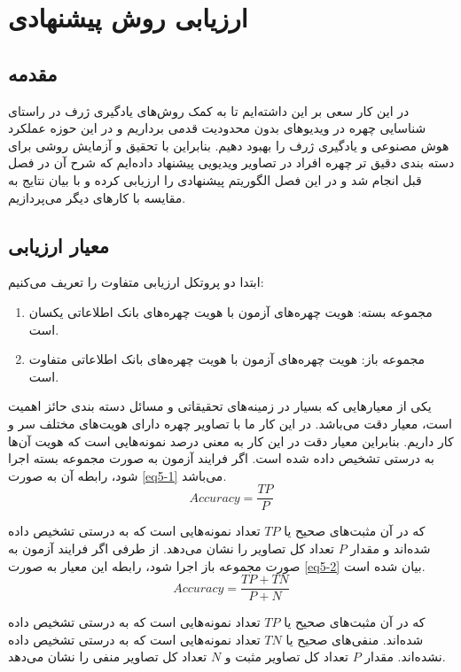\chapter{ارزیابی روش پیشنهادی}
\section{مقدمه}

در این کار سعی بر این داشته‌ایم تا به کمک روش‌های یادگیری ژرف در راستای شناسایی چهره در ویدیوهای بدون محدودیت قدمی برداریم و در این حوزه عملکرد هوش مصنوعی و یادگیری ژرف را بهبود دهیم. بنابراین با تحقیق و آزمایش روشی برای دسته بندی دقیق تر چهره افراد در تصاویر ویدیویی پیشنهاد داده‌ایم که شرح آن در فصل قبل انجام شد و در این فصل الگوریتم پیشنهادی را ارزیابی کرده و با بیان نتایج به مقایسه با کارهای دیگر می‌پردازیم.


\section{معیار ارزیابی}
ابتدا دو پروتکل ارزیابی متفاوت را تعریف می‌کنیم:
\begin{enumerate}
	\item
	مجموعه بسته: هویت‌ چهره‌های آزمون با هویت چهره‌های بانک اطلاعاتی یکسان است. 
	\item
	مجموعه باز: هویت‌ چهره‌های آزمون با هویت چهره‌های بانک اطلاعاتی متفاوت است.
\end{enumerate} 

\noindent
یکی از معیارهایی که بسیار در زمینه‌های تحقیقاتی و مسائل دسته بندی حائز اهمیت است، معیار دقت می‌باشد. در این کار ما با تصاویر چهره دارای هویت‌های مختلف سر و کار داریم. بنابراین معیار دقت در این کار به معنی درصد نمونه‌هایی است که هویت آن‌ها به درستی تشخیص داده شده است. اگر فرایند آزمون به صورت مجموعه بسته اجرا شود، رابطه آن به صورت \ref{eq5-1} می‌باشد.
\begin{equation}\label{eq5-1}
Accuracy = \frac{TP}{P}
\end{equation}

که در آن مثبت‌های صحیح  یا $TP$ تعداد نمونه‌هایی است که به درستی تشخیص داده شده‌اند و مقدار $P$ تعداد کل تصاویر را نشان می‌دهد. از طرفی اگر فرایند آزمون به صورت مجموعه باز اجرا شود، رابطه این معیار به صورت \ref{eq5-2} بیان شده است.
\begin{equation}\label{eq5-2}
	Accuracy = \frac{TP+TN}{P+N}
\end{equation}

\noindent
که در آن مثبت‌های صحیح یا $TP$ تعداد نمونه‌هایی است که به درستی تشخیص داده شده‌اند. منفی‌های صحیح  یا $TN$ تعداد نمونه‌هایی است که به درستی تشخیص داده نشده‌اند. مقدار $P$ تعداد کل تصاویر مثبت و $N$ تعداد کل تصاویر منفی را نشان می‌دهد.

